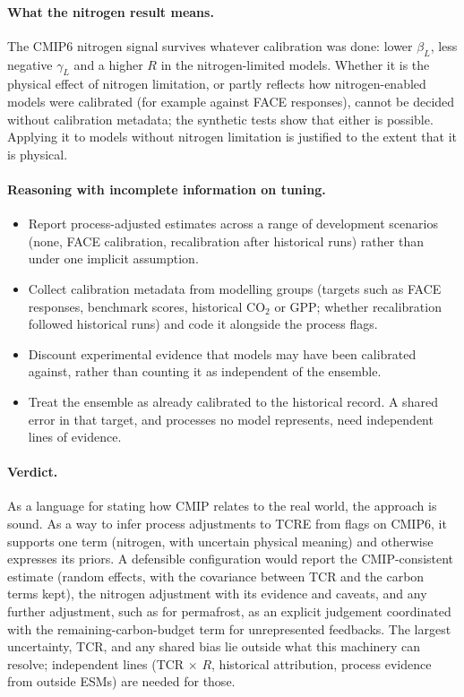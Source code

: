 \documentclass[11pt,a4paper]{article}
\newcommand{\bL}{$\beta_L$}
\newcommand{\gL}{$\gamma_L$}
\begin{document}
\paragraph{What the nitrogen result means.} The CMIP6 nitrogen signal survives whatever calibration was done: lower \bL, less negative \gL{} and a higher $R$ in the nitrogen-limited models. Whether it is the physical effect of nitrogen limitation, or partly reflects how nitrogen-enabled models were calibrated (for example against FACE responses), cannot be decided without calibration metadata; the synthetic tests show that either is possible. Applying it to models without nitrogen limitation is justified to the extent that it is physical.

\paragraph{Reasoning with incomplete information on tuning.}
\begin{itemize}
\item Report process-adjusted estimates across a range of development scenarios (none, FACE calibration, recalibration after historical runs) rather than under one implicit assumption.
\item Collect calibration metadata from modelling groups (targets such as FACE responses, benchmark scores, historical CO$_2$ or GPP; whether recalibration followed historical runs) and code it alongside the process flags.
\item Discount experimental evidence that models may have been calibrated against, rather than counting it as independent of the ensemble.
\item Treat the ensemble as already calibrated to the historical record. A shared error in that target, and processes no model represents, need independent lines of evidence.
\end{itemize}

\paragraph{Verdict.} As a language for stating how CMIP relates to the real world, the approach is sound. As a way to infer process adjustments to TCRE from flags on CMIP6, it supports one term (nitrogen, with uncertain physical meaning) and otherwise expresses its priors. A defensible configuration would report the CMIP-consistent estimate (random effects, with the covariance between TCR and the carbon terms kept), the nitrogen adjustment with its evidence and caveats, and any further adjustment, such as for permafrost, as an explicit judgement coordinated with the remaining-carbon-budget term for unrepresented feedbacks. The largest uncertainty, TCR, and any shared bias lie outside what this machinery can resolve; independent lines (TCR $\times$ $R$, historical attribution, process evidence from outside ESMs) are needed for those.
\end{document}
